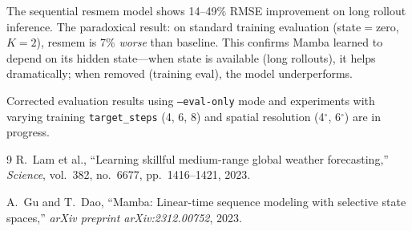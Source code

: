 \documentclass[11pt,a4paper]{article}
\begin{document}
The sequential resmem model shows 14--49\% RMSE improvement on long rollout inference. The paradoxical result: on standard training evaluation (state$=$zero, $K{=}2$), resmem is 7\% \textit{worse} than baseline. This confirms Mamba learned to depend on its hidden state---when state is available (long rollouts), it helps dramatically; when removed (training eval), the model underperforms.

Corrected evaluation results using \texttt{--eval-only} mode and experiments with varying training \texttt{target\_steps} (4, 6, 8) and spatial resolution (4$^\circ$, 6$^\circ$) are in progress.

\begin{thebibliography}{9}
R.~Lam et al., ``Learning skillful medium-range global weather forecasting,'' \textit{Science}, vol.~382, no.~6677, pp.~1416--1421, 2023.

A.~Gu and T.~Dao, ``Mamba: Linear-time sequence modeling with selective state spaces,'' \textit{arXiv preprint arXiv:2312.00752}, 2023.
\end{thebibliography}
\end{document}
